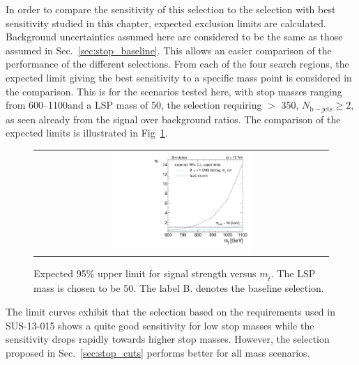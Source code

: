 In order to compare the sensitivity of this selection to the selection with best sensitivity studied in this chapter, expected exclusion limits are calculated. Background uncertainties assumed here are considered to be the same as those assumed in Sec.~\ref{sec:stop_baseline}. This allows an easier comparison of the performance of the different selections. From each of the four search regions, the expected limit giving the best sensitivity to a specific mass point is considered in the comparison. This is for the scenarios tested here, with stop masses ranging from 600--1100\gev and a LSP mass of 50\gev, the selection requiring \met $>$ 350\gev, $N_\mathrm{b-jets} \ge 2$, as seen already from the signal over background ratios. The comparison of the expected limits is illustrated in Fig~\ref{fig:stop_baselinetoptagref_limit}. 
\begin{figure}[!h]
  \centering
  \begin{tabular}{c}
                \includegraphics[width=0.49\textwidth]{figures/limitplot4BinSel_BaselineTopTagTransverseMassRef_LSP50.pdf} 
  \end{tabular}
  \caption{Expected 95\% upper limit for signal strength versus $m_{\tilde{t}}$. The LSP mass is chosen to be 50\gev. The label B. denotes the baseline selection.}
  \label{fig:stop_baselinetoptagref_limit}
\end{figure}
The limit curves exhibit that the selection based on the requirements used in SUS-13-015 shows a quite good sensitivity for low stop masses while the sensitivity drops rapidly towards higher stop masses. However, the selection proposed in Sec.~\ref{sec:stop_cuts} performs better for all mass scenarios.  

 
